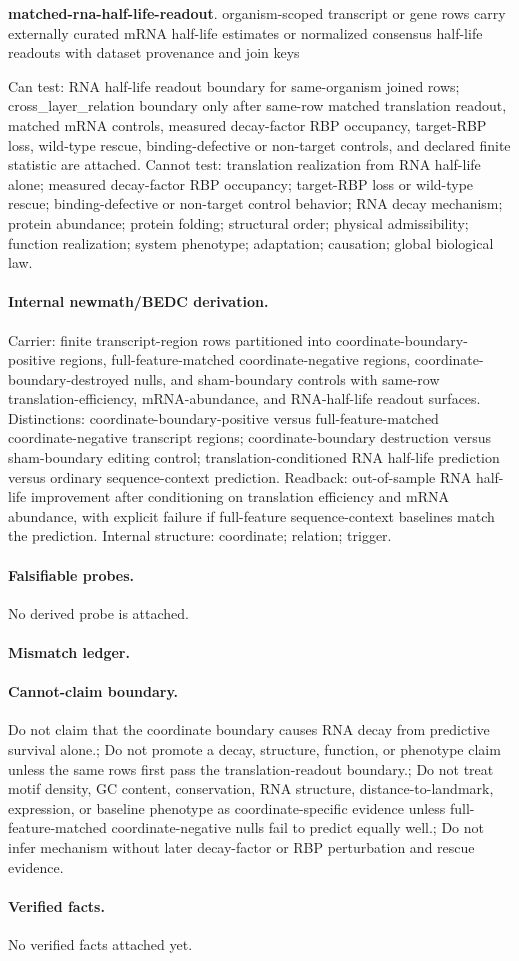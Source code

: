 \textbf{matched-rna-half-life-readout}. organism-scoped transcript or gene rows carry externally curated mRNA half-life estimates or normalized consensus half-life readouts with dataset provenance and join keys

Can test: RNA half-life readout boundary for same-organism joined rows; cross\_layer\_relation boundary only after same-row matched translation readout, matched mRNA controls, measured decay-factor RBP occupancy, target-RBP loss, wild-type rescue, binding-defective or non-target controls, and declared finite statistic are attached. Cannot test: translation realization from RNA half-life alone; measured decay-factor RBP occupancy; target-RBP loss or wild-type rescue; binding-defective or non-target control behavior; RNA decay mechanism; protein abundance; protein folding; structural order; physical admissibility; function realization; system phenotype; adaptation; causation; global biological law.

\paragraph{Internal newmath/BEDC derivation.} Carrier: finite transcript-region rows partitioned into coordinate-boundary-positive regions, full-feature-matched coordinate-negative regions, coordinate-boundary-destroyed nulls, and sham-boundary controls with same-row translation-efficiency, mRNA-abundance, and RNA-half-life readout surfaces. Distinctions: coordinate-boundary-positive versus full-feature-matched coordinate-negative transcript regions; coordinate-boundary destruction versus sham-boundary editing control; translation-conditioned RNA half-life prediction versus ordinary sequence-context prediction. Readback: out-of-sample RNA half-life improvement after conditioning on translation efficiency and mRNA abundance, with explicit failure if full-feature sequence-context baselines match the prediction. Internal structure: coordinate; relation; trigger.

\paragraph{Falsifiable probes.}
No derived probe is attached.

\paragraph{Mismatch ledger.}
\paragraph{Cannot-claim boundary.} Do not claim that the coordinate boundary causes RNA decay from predictive survival alone.; Do not promote a decay, structure, function, or phenotype claim unless the same rows first pass the translation-readout boundary.; Do not treat motif density, GC content, conservation, RNA structure, distance-to-landmark, expression, or baseline phenotype as coordinate-specific evidence unless full-feature-matched coordinate-negative nulls fail to predict equally well.; Do not infer mechanism without later decay-factor or RBP perturbation and rescue evidence.

\paragraph{Verified facts.}
No verified facts attached yet.
